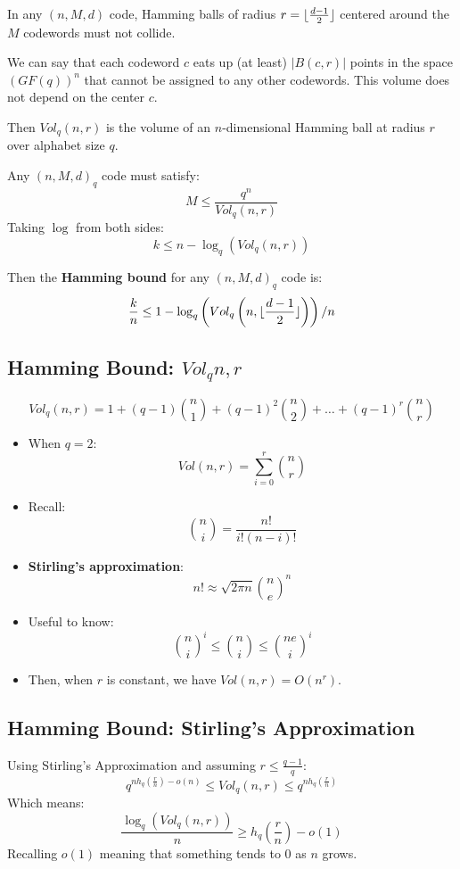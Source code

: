\documentclass[11pt]{article}
\DeclarePairedDelimiter\floor{\lfloor}{\rfloor}
\begin{document}
In any $(n, M, d)$ code, Hamming balls of radius $r = \floor{\frac{d - 1}{2}}$ centered around the $M$ codewords must not collide.

We can say that each codeword $c$ eats up (at least) $\lvert B(c, r) \rvert$ points in the space $(GF(q))^n$ that cannot be assigned to any other codewords.
This volume does not depend on the center $c$.

Then $Vol_q(n, r)$ is the volume of an $n$-dimensional Hamming ball at radius $r$ over alphabet size $q$.

Any $(n, M, d)_q$ code must satisfy:
\[
  M \leq \frac{q^n}{Vol_q(n, r)}
\]
Taking $\log$ from both sides:
\[
  k \leq n - \log_q(Vol_q(n, r))
\]

Then the \textbf{Hamming bound} for any $(n, M, d)_q$ code is:
\[
  \frac{k}{n} \leq 1 - \log_q\left(Vol_q \left(n, \floor{\frac{d - 1}{2}}\right)\right) / n
\]

\subsection{Hamming Bound: $Vol_q{n, r}$}
\[
  Vol_q(n, r) = 1 + (q - 1)\binom{n}{1} + (q - 1)^2 \binom{n}{2} + \ldots + (q - 1)^r \binom{n}{r}
\]

\begin{itemize}
  \item When $q = 2$:
    \[
      Vol(n, r) = \sum_{i = 0}^r \binom{n}{r}
    \]
  \item Recall:
    \[
      \binom{n}{i} = \frac{n!}{i!(n - i)!}
    \]
  \item \textbf{Stirling's approximation}:
    \[
      n! \approx \sqrt{2\pi n}\binom{n}{e}^n
    \]
  \item Useful to know:
    \[
      \binom{n}{i}^i \leq \binom{n}{i} \leq \binom{ne}{i}^i
    \]
  \item Then, when $r$ is constant, we have $Vol(n, r) = O(n^r)$.
\end{itemize}

\subsection{Hamming Bound: Stirling's Approximation}
Using Stirling's Approximation and assuming $r \leq \frac{q - 1}{q}$:
\[
  q^{nh_q \left(\frac{r}{n}\right) - o(n)} \leq Vol_q(n, r) \leq q^{nh_q \left(\frac{r}{n}\right)}
\]
Which means:
\[
  \frac{\log_q(Vol_q(n, r))}{n} \geq h_q \left(\frac{r}{n}\right) - o(1)
\]
Recalling $o(1)$ meaning that something tends to $0$ as $n$ grows.
\end{document}

